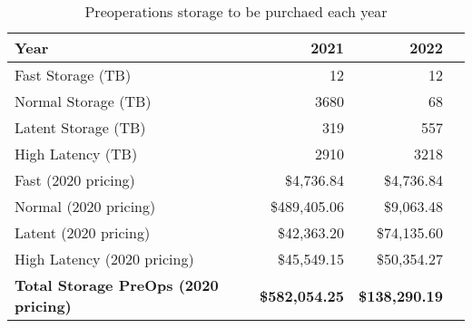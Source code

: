 \tiny \begin{longtable} { |p{}  |r  |r  |r |} 
\caption{Preoperations storage to be purchaed each year \label{tab:preStorage}}\\ 
\hline 
\textbf{Year }&\textbf{2021}&\textbf{2022} \\ \hline
{Fast Storage (TB)}&{12}&{12} \\ \hline
{Normal Storage (TB)}&{3680}&{68} \\ \hline
{Latent Storage  (TB)}&{319}&{557} \\ \hline
{High Latency (TB)}&{2910}&{3218} \\ \hline
{Fast (2020 pricing)}&{\$4,736.84}&{\$4,736.84} \\ \hline
{Normal (2020 pricing)}&{\$489,405.06}&{\$9,063.48} \\ \hline
{Latent (2020 pricing)}&{\$42,363.20}&{\$74,135.60} \\ \hline
{High Latency (2020 pricing)}&{\$45,549.15}&{\$50,354.27} \\ \hline
\textbf{Total Storage PreOps (2020 pricing)}&\textbf{\$582,054.25}&\textbf{\$138,290.19} \\ \hline
\end{longtable} \normalsize
